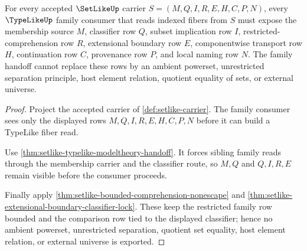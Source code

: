 \begin{theorem}
\label{thm:setlike-family-handoff-obligation}
For every accepted $\SetLikeUp$ carrier $S=(M,Q,I,R,E,H,C,P,N)$, every $\TypeLikeUp$ family consumer that reads indexed fibers from $S$ must expose the membership source $M$, classifier row $Q$, subset implication row $I$, restricted-comprehension row $R$, extensional boundary row $E$, componentwise transport row $H$, continuation row $C$, provenance row $P$, and local naming row $N$. The family handoff cannot replace these rows by an ambient powerset, unrestricted separation principle, host element relation, quotient equality of sets, or external universe.
\end{theorem}
\begin{proof}
Project the accepted carrier of \autoref{def:setlike-carrier}. The family consumer sees only the displayed rows $M,Q,I,R,E,H,C,P,N$ before it can build a TypeLike fiber read.

Use \autoref{thm:setlike-typelike-modeltheory-handoff}. It forces sibling family reads through the membership carrier and the classifier route, so $M,Q$ and $Q,I,R,E$ remain visible before the consumer proceeds.

Finally apply \autoref{thm:setlike-bounded-comprehension-nonescape} and \autoref{thm:setlike-extensional-boundary-classifier-lock}. These keep the restricted family row bounded and the comparison row tied to the displayed classifier; hence no ambient powerset, unrestricted separation, quotient set equality, host element relation, or external universe is exported.
\end{proof}

